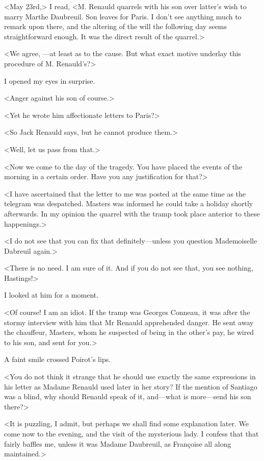  <May 23rd,> I read, <M. Renauld quarrels with his son over latter's wish to marry Marthe Daubreuil. Son leaves for Paris. I don't see anything much to remark upon there, and the altering of the will the following day seems straightforward enough. It was the direct result of the quarrel.> 

 <We agree, —at least as to the cause. But what exact motive underlay this procedure of M. Renauld's?> 

 I opened my eyes in surprise. 

 <Anger against his son of course.> 

 <Yet he wrote him affectionate letters to Paris?> 

 <So Jack Renauld says, but he cannot produce them.> 

 <Well, let us pass from that.> 

 <Now we come to the day of the tragedy. You have placed the events of the morning in a certain order. Have you any justification for that?> 

 <I have ascertained that the letter to me was posted at the same time as the telegram was despatched. Masters was informed he could take a holiday shortly afterwards. In my opinion the quarrel with the tramp took place anterior to these happenings.> 

 <I do not see that you can fix that definitely—unless you question Mademoiselle Dabreuil again.> 

 <There is no need. I am sure of it. And if you do not see that, you see nothing, Hastings!> 

 I looked at him for a moment. 

 <Of course! I am an idiot. If the tramp was Georges Conneau, it was after the stormy interview with him that Mr Renauld apprehended danger. He sent away the chauffeur, Masters, whom he suspected of being in the other's pay, he wired to his son, and sent for you.> 

 A faint smile crossed Poirot's lips. 

 <You do not think it strange that he should use exactly the same expressions in his letter as Madame Renauld used later in her story? If the mention of Santiago was a blind, why should Renauld speak of it, and—what is more—send his son there?> 

 <It is puzzling, I admit, but perhaps we shall find some explanation later. We come now to the evening, and the visit of the mysterious lady. I confess that that fairly baffles me, unless it was Madame Daubreuil, as Françoise all along maintained.> 

